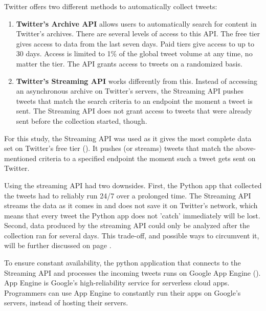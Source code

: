 
Twitter offers two different methods to automatically collect tweets:
\begin{enumerate}
    \item \textbf{Twitter's Archive API} allows users to automatically search for content in Twitter's archives. There are several levels of access to this API. The free tier gives access to data from the last seven days. Paid tiers give access to up to 30 days. Access is limited to 1\% of the global tweet volume at any time, no matter the tier. The API grants access to tweets on a randomized basis.
    \item \textbf{Twitter's Streaming API} works differently from this. Instead of accessing an asynchronous archive on Twitter's servers, the Streaming API pushes tweets that match the search criteria to an endpoint the moment a tweet is sent. The Streaming API does not grant access to tweets that were already sent before the collection started, though.
\end{enumerate}

For this study, the Streaming API was used as it gives the most complete data set on Twitter's free tier (\cite{brunsTwitterDataWhat2014}). It pushes (or streams) tweets that match the above-mentioned criteria to a specified endpoint the moment such a tweet gets sent on Twitter. %


Using the streaming API had two downsides. First, the Python app that collected the tweets had to reliably run 24/7 over a prolonged time. The Streaming API streams the data as it comes in and does not save it on Twitter's network, which means that every tweet the Python app does not 'catch' immediately will be lost. Second, data produced by the streaming API could only be analyzed after the collection ran for several days. This trade-off, and possible ways to circumvent it, will be further discussed on page \pageref{sec:fixedDataSet}.

To ensure constant availability, the python application that connects to the Streaming API and processes the incoming tweets runs on Google App Engine (\cite{googleAppEngineApplication2020}). App Engine is Google's high-reliability service for serverless cloud apps. Programmers can use App Engine to constantly run their apps on Google's servers, instead of hosting their servers.

